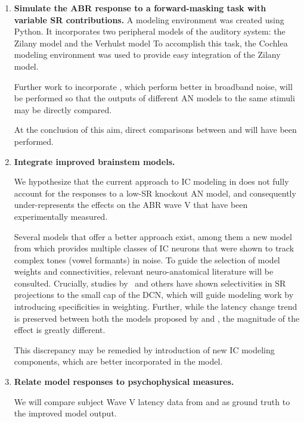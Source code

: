 \begin{enumerate}
	\item \textbf{Simulate the ABR response to a forward-masking task with variable SR contributions.}
	A modeling environment was created using Python.  It incorporates two peripheral models of the auditory system: the Zilany model \citep{Zilany2014Updated} and the Verhulst model \citep{}
	To accomplish this task, the Cochlea modeling environment \citep{Rudnicki2014Cochlea} was used to provide easy integration of the Zilany model. \citep{Zilany2014Updated}

	Further work to incorporate \cite{Verhulst2015Functional}, which perform better in broadband noise, will be performed so that the outputs of different AN models to the same stimuli may be directly compared.

	At the conclusion of this aim, direct comparisons between \cite{Zilany2014Updated} and \cite{Verhulst2015Functional} will have been performed.

	\item \textbf{Integrate improved brainstem models.}  

	We hypothesize that the current approach to IC modeling in \cite{Verhulst2015Functional} does not fully account for the responses to a low-SR knockout AN model, and consequently under-represents the effects on the ABR wave V that have been experimentally measured.  

	Several models that offer a better approach exist, among them a new model from \cite{Carney2015Speech} which provides multiple classes of IC neurons that were shown to track complex tones (vowel formants) in noise.  To guide the selection of model weights and connectivities, relevant neuro-anatomical literature will be consulted.  Crucially, studies by~\cite{Ryugo2008Projections} and others have shown selectivities in SR projections to the small cap of the DCN, which will guide modeling work by introducing specificities in weighting. Further, while the latency change trend is preserved between both the models proposed by \citeauthor{Zilany2014Updated} and \citeauthor{Verhulst2015Functional}, the magnitude of the effect is greatly different.  

	This discrepancy may be remedied by introduction of new IC modeling components, which are better incorporated in the \cite{Zilany2014Updated} model.
	
	\item \textbf{Relate model responses to psychophysical measures.}  

	We will compare subject Wave V latency data from \citeauthor{Mehraei2015Individual} and \citeauthor{Mehraei2016Auditory} as ground truth to the improved model output.
	
	
\end{enumerate}